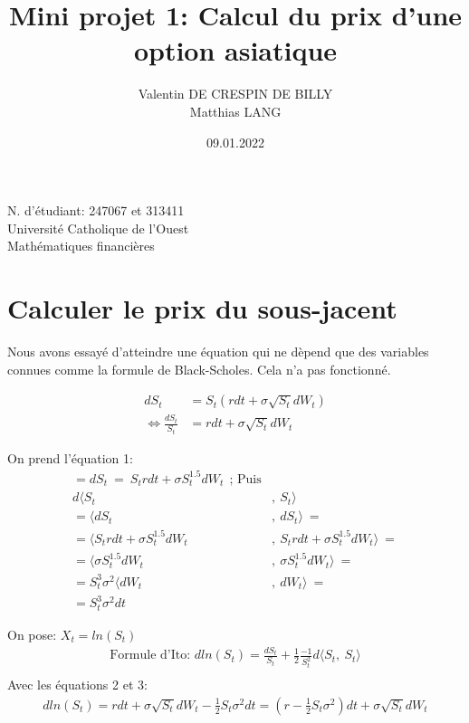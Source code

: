 \documentclass[a4paper,12pt]{scrartcl}
\title{Mini projet 1: Calcul du prix d'une option asiatique}
\author{Valentin DE CRESPIN DE BILLY \\ Matthias LANG}
\date{09.01.2022}
\begin{document}
\maketitle
\begin{center}

  \thispagestyle{empty}

  N. d'étudiant: 247067 et 313411\\
  Université Catholique de l'Ouest\\
  Mathématiques financières

\end{center}

\newpage

\section{Calculer le prix du sous-jacent}

Nous avons essayé d'atteindre une équation qui ne dèpend que des variables connues comme la formule de Black-Scholes.
Cela n'a pas fonctionné.

\begin{align}%
dS_t  &=  S_t(rdt+\sigma \sqrt{S_t} dW_t) \\
     \iff \frac{dS_t}{S_t}  &=  rdt+\sigma \sqrt{S_t} dW_t
\end{align}


On prend l'équation 1:
\begin{align*}
= dS_t~=~S_trdt+\sigma S_t^{1.5} dW_t ~~
\text{; Puis} \\
d \langle S_t &, ~ S_t\rangle \\
=\langle dS_t &,~ dS_t\rangle ~=\\
=\langle S_trdt+\sigma S_t^{1.5} dW_t &,~
         S_trdt+\sigma S_t^{1.5} dW_t \rangle ~=\\
=\langle \sigma S_t^{1.5} dW_t &,~
         \sigma S_t^{1.5} dW_t \rangle ~=\\
=S_t^3 \sigma^2 \langle dW_t &,~  dW_t \rangle ~=\\
=S_t^3 \sigma^2 dt
\end{align*}


On pose: 
$X_t = ln(S_t)$
\begin{align}
\text{Formule d'Ito: } dln(S_t) = \frac{dS_t}{S_t} + \frac{1}{2} \frac{-1}{S_t^2}d \langle S_t, ~S_t \rangle \\
\end{align}
Avec les équations 2 et 3:
\begin{align}
dln(S_t) = 
rdt + \sigma \sqrt{S_t} dW_t - \frac{1}{2}S_t \sigma^2 dt =
(r - \frac{1}{2}S_t\sigma^2)dt + \sigma\sqrt{S_t}dW_t
\end{align}
\end{document}

